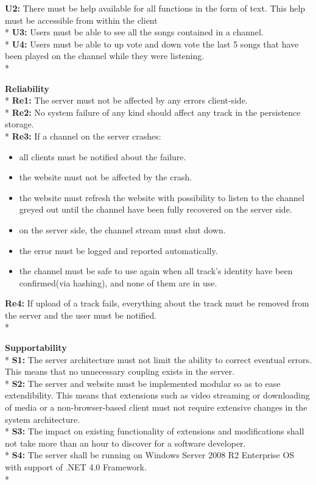 \documentclass[a4paper,11pt,report]{article}
\begin{document}
{\textbf{U2:} There must be help available for all functions in the form of text. This help must be accessible from within the client \\*
\textbf{U3:} Users must be able to see all the songs contained in a channel. \\*
\textbf{U4:} Users must be able to up vote and down vote the last 5 songs that have been played on the channel while they were listening. \\*

\textbf{Reliability} \\*
\textbf{Re1:} The server must not be affected by any errors client-side. \\*
\textbf{Re2:} No system failure of any kind should affect any track in the persistence storage. \\*
\textbf{Re3:} If a channel on the server crashes:
\begin{itemize}
\item all clients must be notified about the failure.
\item the website must not be affected by the crash.
\item the website must refresh the website with possibility to listen to the channel greyed out until the channel have been fully recovered on the server side.
\item on the server side, the channel stream must shut down.
\item the error must be logged and reported automatically. 
\item the channel must be safe to use again when all track's identity have been confirmed(via hashing), and none of them are in use.
\end{itemize}
\textbf{Re4:} If upload of a track fails, everything about the track must be removed from the server and the user must be notified. \\*

\textbf{Supportability} \\*
\textbf{S1:} The server architecture must not limit the ability to correct eventual errors. This means that no unnecessary coupling exists in the server. \\*
\textbf{S2:} The server and website must be implemented modular so as to ease extendibility. This means that extensions such as video streaming or downloading of media or a non-browser-based client must not require extensive changes in the system architecture.\\*
\textbf{S3:} The impact on existing functionality of extensions and modifications shall not take more than an hour to discover for a software developer. \\*
\textbf{S4:} The server shall be running on Windows Server 2008 R2 Enterprise OS with support of .NET 4.0 Framework.\\*

}
\end{document}
